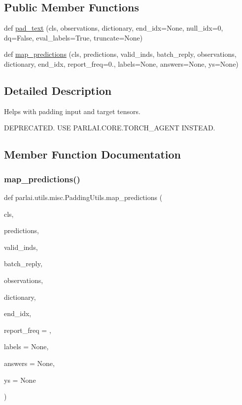 \subsection*{Public Member Functions}
\begin{DoxyCompactItemize}
\item 
def \hyperlink{classparlai_1_1utils_1_1misc_1_1PaddingUtils_acd7178452139c55dc56e9889b10347cc}{pad\+\_\+text} (cls, observations, dictionary, end\+\_\+idx=None, null\+\_\+idx=0, dq=False, eval\+\_\+labels=True, truncate=None)
\item 
def \hyperlink{classparlai_1_1utils_1_1misc_1_1PaddingUtils_ae862960e8f261ff4088d5dedbe42a25c}{map\+\_\+predictions} (cls, predictions, valid\+\_\+inds, batch\+\_\+reply, observations, dictionary, end\+\_\+idx, report\+\_\+freq=0., labels=None, answers=None, ys=None)
\end{DoxyCompactItemize}


\subsection{Detailed Description}
\begin{DoxyVerb}Helps with padding input and target tensors.

DEPRECATED. USE PARLAI.CORE.TORCH_AGENT INSTEAD.
\end{DoxyVerb}
 

\subsection{Member Function Documentation}
\mbox{\label{classparlai_1_1utils_1_1misc_1_1PaddingUtils_ae862960e8f261ff4088d5dedbe42a25c}} 
\subsubsection{\texorpdfstring{map\+\_\+predictions()}{map\_predictions()}}
{\footnotesize\ttfamily def parlai.\+utils.\+misc.\+Padding\+Utils.\+map\+\_\+predictions (\begin{DoxyParamCaption}\item[{}]{cls,  }\item[{}]{predictions,  }\item[{}]{valid\+\_\+inds,  }\item[{}]{batch\+\_\+reply,  }\item[{}]{observations,  }\item[{}]{dictionary,  }\item[{}]{end\+\_\+idx,  }\item[{}]{report\+\_\+freq = {},  }\item[{}]{labels = {\ttfamily None},  }\item[{}]{answers = {\ttfamily None},  }\item[{}]{ys = {\ttfamily None} }\end{DoxyParamCaption})}

